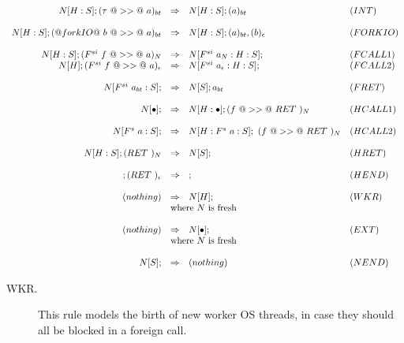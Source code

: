 \documentclass[a4paper,twoside]{article}
\newcommand{\hcall}{H}
\newcommand{\fcall}[2]{F^{#1}~#2}
\newcommand{\ret}[1]{RET~#1}
\begin{document}
$$
\begin{array}{rcll}
N[\hcall:S]; (\tau~@>>@~a)_{bt} 
        & \Rightarrow 
        & N[\hcall:S]; (a)_{bt} & (INT) \\
\\
N[\hcall:S]; (@forkIO@~b~@>>@~a)_{bt} 
        & \Rightarrow 
        & N[\hcall:S]; (a)_{bt}, (b)_\epsilon & (FORKIO) \\
\\
N[\hcall:S]; (\fcall{si}{f}~@>>@~a)_N 
        & \Rightarrow 
        & N[\fcall{si}{a_N}:\hcall:S];  & (FCALL1) \\
N[\hcall]; (\fcall{si}{f}~@>>@~a)_\epsilon 
        & \Rightarrow 
        & N[\fcall{si}{a_\epsilon}:\hcall:S];  & (FCALL2) \\
\\
N[\fcall{si}{a_{bt}}:S];  
        & \Rightarrow 
        & N[S]; a_{bt} & (FRET) \\
\\
N[\bullet];
        & \Rightarrow 
        & N[\hcall:\bullet];  (f ~@>>@~ \ret{})_{N} & (HCALL1) \\
\\
N[\fcall{s}{a} : S]; 
        & \Rightarrow 
        & N[\hcall : \fcall{s}{a} : S]; ~ (f ~@>>@~ \ret{})_{N} & (HCALL2) \\
 \\
N[\hcall : S]; (\ret{})_N
        & \Rightarrow 
        & N[S]; & (HRET) \\
\\
; (\ret{})_\epsilon
        & \Rightarrow 
        & ; & (HEND) \\
\\
(nothing)
        & \Rightarrow 
        & N[\hcall]; & (WKR) \\
        & \multicolumn{2}{l}{\mbox{where $N$ is fresh}} \\
\\
(nothing)
        & \Rightarrow 
        & N[\bullet]; & (EXT) \\
        & \multicolumn{2}{l}{\mbox{where $N$ is fresh}} \\
 \\
N[S];
        & \Rightarrow 
        & (nothing) & (NEND) \\
\end{array}
$$

\begin{description}

\item[WKR.] This rule models the birth of new worker OS threads, in case they should
all be blocked in a foreign call.
\end{description}
\end{document}

